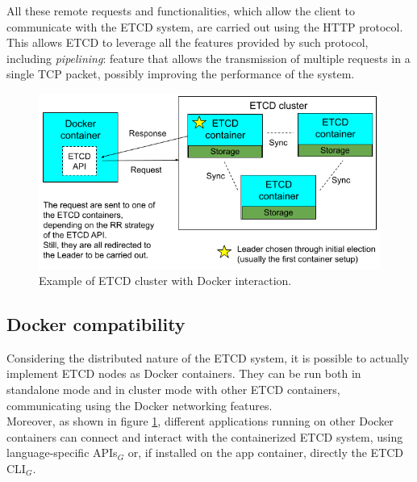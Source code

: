 All these remote requests and functionalities, which allow the client to communicate with the ETCD system, are carried out using the HTTP protocol. This allows ETCD to leverage all the features provided by such protocol, including \textit{pipelining}: feature that allows the transmission of multiple requests in a single TCP packet, possibly improving the performance of the system. \cite{site:http-pipelining}
\begin{figure}[h!]
	\centering
	\includegraphics[width=0.85\linewidth]{"immagini/Technologies/ETCD cluster"}
	\caption[Example of ETCD cluster with Docker interaction.]{Example of ETCD cluster with Docker interaction.}
	\label{fig:etcd-cluster}
\end{figure}

\subsection{Docker compatibility}
Considering the distributed nature of the ETCD system, it is possible to actually implement ETCD nodes as Docker containers. They can be run both in standalone mode and in cluster mode \cite{site:etcd-docker} with other ETCD containers, communicating using the Docker networking features. \\
Moreover, as shown in figure \ref{fig:etcd-cluster}, different applications running on other Docker containers can connect and interact with the containerized ETCD system, using language-specific APIs$_G$ or, if installed on the app container, directly the ETCD CLI$_G$.

